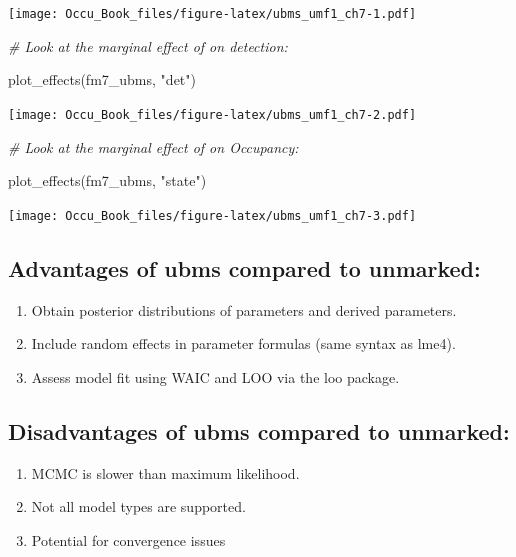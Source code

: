 \documentclass[
]{book}
\newenvironment{Shaded}{\begin{snugshade}}{\end{snugshade}}
\newcommand{\CommentTok}[1]{\textcolor[rgb]{0.56,0.35,0.01}{\textit{#1}}}
\newcommand{\FunctionTok}[1]{\textcolor[rgb]{0.00,0.00,0.00}{#1}}
\newcommand{\NormalTok}[1]{#1}
\newcommand{\StringTok}[1]{\textcolor[rgb]{0.31,0.60,0.02}{#1}}
\begin{document}
\texttt{[image: Occu\_Book\_files/figure-latex/ubms\_umf1\_ch7-1.pdf]}

\begin{Shaded}
\begin{Highlighting}[]
\CommentTok{\# Look at the marginal effect of on detection:}

\FunctionTok{plot\_effects}\NormalTok{(fm7\_ubms, }\StringTok{"det"}\NormalTok{)}
\end{Highlighting}
\end{Shaded}

\texttt{[image: Occu\_Book\_files/figure-latex/ubms\_umf1\_ch7-2.pdf]}

\begin{Shaded}
\begin{Highlighting}[]
\CommentTok{\# Look at the marginal effect of on Occupancy:}

\FunctionTok{plot\_effects}\NormalTok{(fm7\_ubms, }\StringTok{"state"}\NormalTok{)}
\end{Highlighting}
\end{Shaded}

\texttt{[image: Occu\_Book\_files/figure-latex/ubms\_umf1\_ch7-3.pdf]}

\hypertarget{advantages-of-ubms-compared-to-unmarked}{%
\subsection{Advantages of ubms compared to unmarked:}\label{advantages-of-ubms-compared-to-unmarked}}

\begin{enumerate}
\def\labelenumi{\arabic{enumi}.}
\item
  Obtain posterior distributions of parameters and derived parameters.
\item
  Include random effects in parameter formulas (same syntax as lme4).
\item
  Assess model fit using WAIC and LOO via the loo package.
\end{enumerate}

\hypertarget{disadvantages-of-ubms-compared-to-unmarked}{%
\subsection{Disadvantages of ubms compared to unmarked:}\label{disadvantages-of-ubms-compared-to-unmarked}}

\begin{enumerate}
\def\labelenumi{\arabic{enumi}.}
\item
  MCMC is slower than maximum likelihood.
\item
  Not all model types are supported.
\item
  Potential for convergence issues
\end{enumerate}
\end{document}
